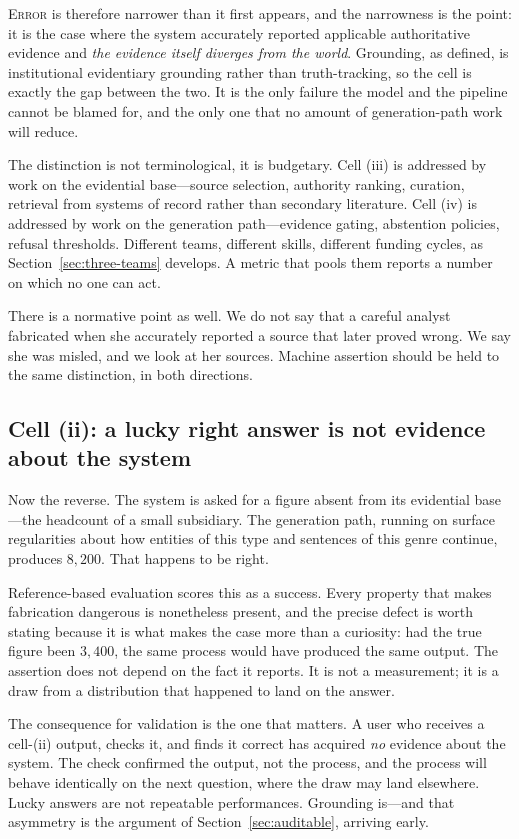 \textsc{Error} is therefore narrower than it first appears, and the narrowness is the
point: it is the case where the system accurately reported applicable authoritative
evidence and \emph{the evidence itself diverges from the world}. Grounding, as defined, is
institutional evidentiary grounding rather than truth-tracking, so the cell is exactly the
gap between the two. It is the only failure the model and the pipeline cannot be blamed
for, and the only one that no amount of generation-path work will reduce.

The distinction is not terminological, it is budgetary. Cell (iii) is addressed by
work on the evidential base---source selection, authority ranking, curation,
retrieval from systems of record rather than secondary literature. Cell (iv) is
addressed by work on the generation path---evidence gating, abstention policies,
refusal thresholds. Different teams, different skills, different funding cycles, as
Section~\ref{sec:three-teams} develops. A metric that pools them reports a number
on which no one can act.

There is a normative point as well. We do not say that a careful analyst
fabricated when she accurately reported a source that later proved wrong. We say
she was misled, and we look at her sources. Machine assertion should be held to the
same distinction, in both directions.

\subsection{Cell (ii): a lucky right answer is not evidence about the system}
\label{sec:cell-ii}

Now the reverse. The system is asked for a figure absent from its evidential
base---the headcount of a small subsidiary. The generation path, running on surface
regularities about how entities of this type and sentences of this genre continue,
produces $8{,}200$. That happens to be right.

Reference-based evaluation scores this as a success. Every property that makes
fabrication dangerous is nonetheless present, and the precise defect is worth
stating because it is what makes the case more than a curiosity: had the true
figure been $3{,}400$, the same process would have produced the same output. The
assertion does not depend on the fact it reports. It is not a measurement; it is a
draw from a distribution that happened to land on the answer.

The consequence for validation is the one that matters. A user who receives a
cell-(ii) output, checks it, and finds it correct has acquired \emph{no} evidence
about the system. The check confirmed the output, not the process, and the process
will behave identically on the next question, where the draw may land elsewhere.
Lucky answers are not repeatable performances. Grounding is---and that asymmetry
is the argument of Section~\ref{sec:auditable}, arriving early.

